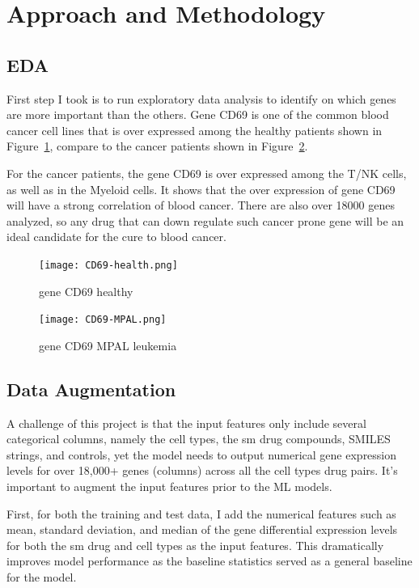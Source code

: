 \documentclass[11pt, oneside]{article}   	%
\begin{document}
\section*{Approach and Methodology}

\subsection{EDA}

First step I took is to run exploratory data analysis to identify on which genes are more important than the others. Gene CD69 is one of the common blood cancer cell lines that is over expressed among the healthy patients shown in Figure~\ref{fig:CD69healthy}, compare to the cancer patients shown in Figure~\ref{fig:CD69MPAL}. 

For the cancer patients, the gene CD69 is over expressed among the T/NK cells, as well as in the Myeloid cells. It shows that the over expression of gene CD69 will have a strong correlation of blood cancer. There are also over 18000 genes analyzed, so any drug that can down regulate such cancer prone gene will be an ideal candidate for the cure to blood cancer. 

\begin{figure}[htbp]
  \centering
  \texttt{[image: CD69-health.png]}
  \caption{gene CD69 healthy}
  \label{fig:CD69healthy}
\end{figure}


\begin{figure}[htbp]
  \centering
  \texttt{[image: CD69-MPAL.png]}
  \caption{gene CD69 MPAL leukemia}
  \label{fig:CD69MPAL}
\end{figure}


\subsection{Data Augmentation}

A challenge of this project is that the input features only include several categorical columns, namely the cell types, the sm drug compounds, SMILES strings, and controls, yet the model needs to output numerical gene expression levels for over 18,000+ genes (columns) across all the cell types drug pairs. It's important to augment the input features prior to the ML models. 

First, for both the training and test data, I add the numerical features such as mean, standard deviation, and median of the gene differential expression levels for both the sm drug and cell types as the input features. This dramatically improves model performance as the baseline statistics served as a general baseline for the model. 
\end{document}
